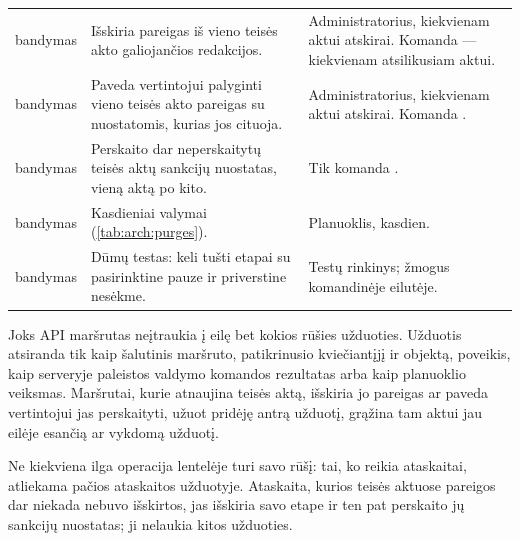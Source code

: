 \begin{xltabular}{\textwidth}{@{}L{37mm}YL{43mm}@{}}
\newline {} bandymas & Išskiria pareigas iš vieno teisės akto galiojančios redakcijos. & Administratorius, kiekvienam aktui atskirai. Komanda  --- kiekvienam atsilikusiam aktui. \\
\newline {} bandymas & Paveda vertintojui palyginti vieno teisės akto pareigas su nuostatomis, kurias jos cituoja. & Administratorius, kiekvienam aktui atskirai. Komanda . \\
\newline {} bandymas & Perskaito dar neperskaitytų teisės aktų sankcijų nuostatas, vieną aktą po kito. & Tik komanda . \\
\newline {} bandymas & Kasdieniai valymai (\cref{tab:arch:purges}). & Planuoklis, kasdien. \\
\newline {} bandymas & Dūmų testas: keli tušti etapai su pasirinktine pauze ir priverstine nesėkme. & Testų rinkinys; žmogus komandinėje eilutėje. \\
\end{xltabular}

Joks API maršrutas neįtraukia į eilę bet kokios rūšies užduoties. Užduotis atsiranda tik kaip
šalutinis maršruto, patikrinusio kviečiantįjį ir objektą, poveikis, kaip serveryje paleistos
valdymo komandos rezultatas arba kaip planuoklio veiksmas. Maršrutai, kurie atnaujina teisės aktą,
išskiria jo pareigas ar paveda vertintojui jas perskaityti, užuot pridėję antrą užduotį,
grąžina tam aktui jau eilėje esančią ar vykdomą užduotį.

Ne kiekviena ilga operacija lentelėje turi savo rūšį: tai, ko reikia ataskaitai, atliekama
pačios ataskaitos užduotyje. Ataskaita, kurios teisės aktuose pareigos dar niekada nebuvo
išskirtos, jas išskiria savo  etape ir ten pat perskaito jų sankcijų
nuostatas; ji nelaukia kitos užduoties.

